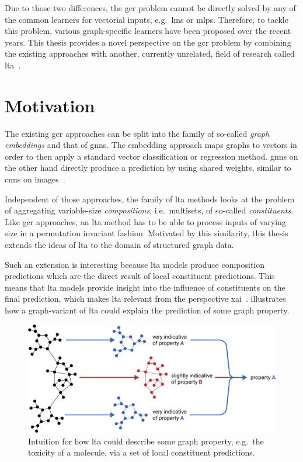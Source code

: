 Due to those two differences, the \ac{gcr} problem cannot be directly solved by any of the common learners for vectorial inputs, e.g.\ \acp{lm} or \acp{mlp}.
Therefore, to tackle this problem, various graph-specific learners have been proposed over the recent years.
This thesis provides a novel perspective on the \ac{gcr} problem by combining the existing approaches with another, currently unrelated, field of research called \ac{lta}~\cite{Melnikov2016}\cite{Melnikov2019}.

\section{Motivation}%
\label{sec:intro:motivation}

The existing \ac{gcr} approaches can be split into the family of so-called \textit{graph embeddings} and that of \acp{gnn}.
The embedding approach maps graphs to vectors in order to then apply a standard vector classification or regression method.
\Acp{gnn} on the other hand directly produce a prediction by using shared weights, similar to \acp*{cnn} on images~\cite{LeCun1998}.

Independent of those approaches, the family of \ac{lta} methods looks at the problem of aggregating variable-size \textit{compositions}, i.e.\ multisets, of so-called \textit{constituents}.
Like \ac{gcr} approaches, an \ac{lta} method has to be able to process inputs of varying size in a permutation invariant fashion.
Motivated by this similarity, this thesis extends the ideas of \ac{lta} to the domain of structured graph data.

Such an extension is interesting because \ac{lta} models produce composition predictions which are the direct result of local constituent predictions.
This means that \ac{lta} models provide insight into the influence of constituents on the final prediction, which makes \ac{lta} relevant from the perspective \ac{xai}~\cite{Gilpin2018}.
 illustrates how a graph-variant of \ac{lta} could explain the prediction of some graph property.
\begin{figure}[ht]
	\centering
	\includegraphics[width=0.8\linewidth]{gfx/introduction/intuition.pdf}
	\caption{Intuition for how \ac{lta} could describe some graph property, e.g.\ the toxicity of a molecule, via a set of local constituent predictions.}\label{fig:intro:intuition}
\end{figure}

